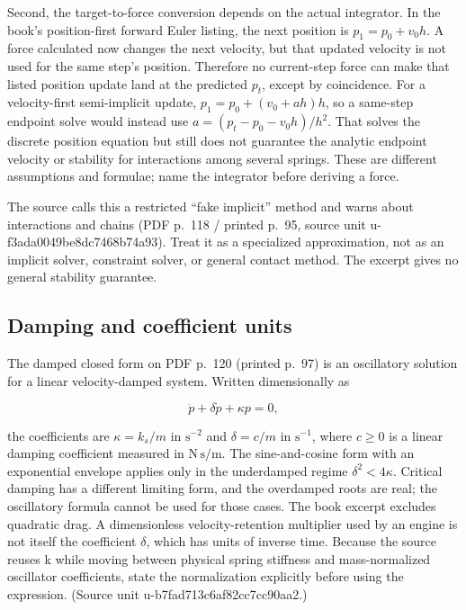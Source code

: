 Second, the target-to-force conversion depends on the actual integrator. In the book's position-first forward Euler listing, the next position is \(p_1=p_0+v_0h\). A force calculated now changes the next velocity, but that updated velocity is not used for the same step's position. Therefore no current-step force can make that listed position update land at the predicted \(p_t\), except by coincidence. For a velocity-first semi-implicit update, \(p_1=p_0+(v_0+ah)h\), so a same-step endpoint solve would instead use \(a=(p_t-p_0-v_0h)/h^2\). That solves the discrete position equation but still does not guarantee the analytic endpoint velocity or stability for interactions among several springs. These are different assumptions and formulae; name the integrator before deriving a force.

The source calls this a restricted ``fake implicit'' method and warns about interactions and chains (PDF p.~118 / printed p.~95, source unit u-f3ada0049be8dc7468b74a93). Treat it as a specialized approximation, not as an implicit solver, constraint solver, or general contact method. The excerpt gives no general stability guarantee.

\subsection{Damping and coefficient units}\label{06-engine-ii-ch047-damping-and-coefficient-units}

The damped closed form on PDF p.~120 (printed p.~97) is an oscillatory solution for a linear velocity-damped system. Written dimensionally as

\[
\ddot p+\delta\dot p+\kappa p=0,
\]

the coefficients are \(\kappa=k_s/m\) in \(\mathrm{s^{-2}}\) and \(\delta=c/m\) in \(\mathrm{s^{-1}}\), where \(c\geq0\) is a linear damping coefficient measured in \(\mathrm{N\,s/m}\). The sine-and-cosine form with an exponential envelope applies only in the underdamped regime \(\delta^2<4\kappa\). Critical damping has a different limiting form, and the overdamped roots are real; the oscillatory formula cannot be used for those cases. The book excerpt excludes quadratic drag. A dimensionless velocity-retention multiplier used by an engine is not itself the coefficient \(\delta\), which has units of inverse time. Because the source reuses k while moving between physical spring stiffness and mass-normalized oscillator coefficients, state the normalization explicitly before using the expression. (Source unit u-b7fad713c6af82cc7cc90aa2.)


